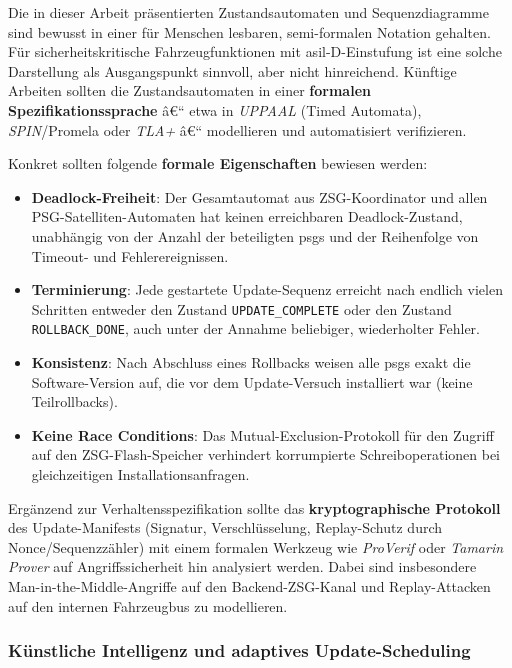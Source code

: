 ﻿\documentclass[12pt,a4paper,twoside]{article}
\begin{document}
Die in dieser Arbeit präsentierten Zustandsautomaten und
Sequenzdiagramme sind bewusst in einer für Menschen lesbaren,
semi-formalen Notation gehalten. Für sicherheitskritische
Fahrzeugfunktionen mit \gls{asil}-D-Einstufung ist eine solche
Darstellung als Ausgangspunkt sinnvoll, aber nicht hinreichend.
Künftige Arbeiten sollten die Zustandsautomaten in einer
\textbf{formalen Spezifikationssprache} â€“ etwa in \textit{UPPAAL}
(Timed Automata), \textit{SPIN}/Promela oder \textit{TLA+} â€“
modellieren und automatisiert verifizieren.

Konkret sollten folgende \textbf{formale Eigenschaften} bewiesen werden:

\begin{itemize}
  \item \textbf{Deadlock-Freiheit}: Der Gesamtautomat aus ZSG-Koordinator
    und allen PSG-Satelliten-Automaten hat keinen erreichbaren
    Deadlock-Zustand, unabhängig von der Anzahl der beteiligten \glspl{psg}
    und der Reihenfolge von Timeout- und Fehlerereignissen.
  \item \textbf{Terminierung}: Jede gestartete Update-Sequenz erreicht
    nach endlich vielen Schritten entweder den Zustand
    \texttt{UPDATE\_COMPLETE} oder den Zustand \texttt{ROLLBACK\_DONE},
    auch unter der Annahme beliebiger, wiederholter Fehler.
  \item \textbf{Konsistenz}: Nach Abschluss eines Rollbacks weisen alle
    \glspl{psg} exakt die Software-Version auf, die vor dem
    Update-Versuch installiert war (keine Teilrollbacks).
  \item \textbf{Keine Race Conditions}: Das Mutual-Exclusion-Protokoll
    für den Zugriff auf den ZSG-Flash-Speicher verhindert korrumpierte
    Schreiboperationen bei gleichzeitigen Installationsanfragen.
\end{itemize}

Ergänzend zur Verhaltensspezifikation sollte das
\textbf{kryptographische Protokoll} des Update-Manifests (Signatur,
Verschlüsselung, Replay-Schutz durch Nonce/Sequenzzähler) mit einem
formalen Werkzeug wie \textit{ProVerif} oder \textit{Tamarin Prover}
auf Angriffssicherheit hin analysiert werden. Dabei sind insbesondere
Man-in-the-Middle-Angriffe auf den Backend-ZSG-Kanal und
Replay-Attacken auf den internen Fahrzeugbus zu modellieren.

\subsubsection{Künstliche Intelligenz und adaptives Update-Scheduling}
\end{document}
